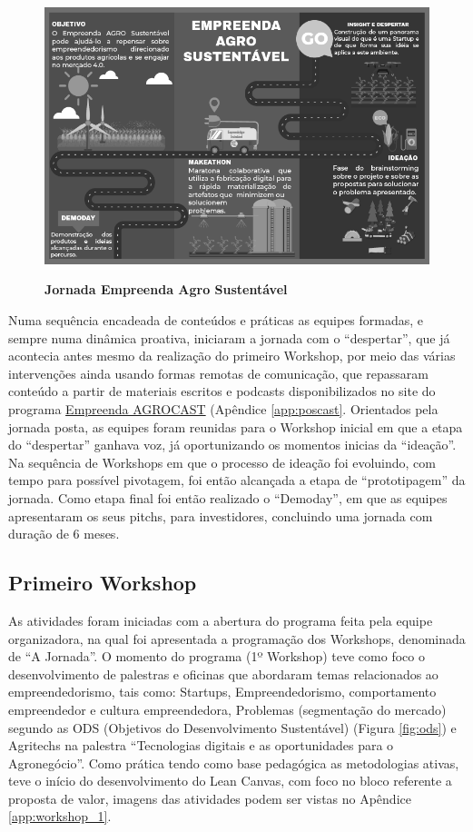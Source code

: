 \begin{figure}[H]
\centering
\caption{\textbf{Jornada Empreenda Agro Sustentável}}
\includegraphics[scale=0.5]{Imagens/jornada.png}
\label{figura_17}
\end{figure}


Numa sequência encadeada de conteúdos e práticas as equipes formadas, e sempre numa dinâmica proativa, iniciaram a jornada com o “despertar”, que já acontecia antes mesmo da realização do primeiro Workshop, por meio das várias intervenções ainda usando formas remotas de comunicação, que repassaram conteúdo a partir de materiais escritos e  podcasts disponibilizados no site do programa \href{https://open.spotify.com/show/3c25hRSxvaCFPw6Y3lX3i1?si=9H_fGz_uRgGiFNhAcdr4rQ}{Empreenda AGROCAST} (Apêndice \ref{app:poscast}. Orientados pela jornada posta, as equipes foram reunidas para o Workshop inicial em que a etapa do “despertar” ganhava voz, já oportunizando os momentos inicias da “ideação”. Na sequência de Workshops em que o processo de ideação foi evoluindo, com tempo para possível pivotagem, foi então alcançada a etapa   de “prototipagem” da jornada. Como etapa final foi então realizado o “Demoday”, em que as equipes apresentaram os seus pitchs, para investidores, concluindo uma jornada com duração de 6 meses.


\subsection{Primeiro Workshop}

As atividades foram iniciadas com a abertura do programa feita pela equipe organizadora, na qual foi apresentada a programação dos Workshops, denominada de “A Jornada”. O momento do programa (1º Workshop) teve como foco o desenvolvimento de palestras e oficinas que abordaram temas relacionados ao empreendedorismo, tais como: Startups, Empreendedorismo, comportamento empreendedor e cultura empreendedora, Problemas (segmentação do mercado) segundo as ODS (Objetivos do Desenvolvimento Sustentável) (Figura \ref{fig:ods}) e Agritechs na palestra “Tecnologias digitais e as oportunidades para o Agronegócio”. Como prática tendo como base pedagógica as metodologias ativas, teve o início do desenvolvimento do Lean Canvas, com foco no bloco referente a proposta de valor, imagens das atividades podem ser vistas no Apêndice \ref{app:workshop_1}.

